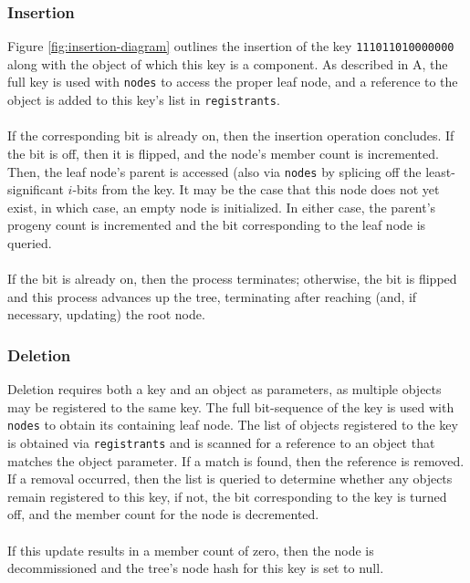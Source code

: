 \documentclass[11pt,letterpaper]{article}
\begin{document}
\subsubsection{Insertion}
Figure \ref{fig:insertion-diagram} outlines the insertion of the key
{\tt 111011010000000} along with the object of which this key
is a component.  As described in A, the full key is used with {\tt nodes}
to access the proper leaf node, and a reference to the object is
added to this key's list in {\tt registrants}.

\paragraph{}
If the corresponding bit is already on, then the insertion operation
concludes. If the bit is off, then it is flipped, and the node's member count
is incremented.  Then, the leaf node's parent is accessed (also via
{\tt nodes} by splicing off the least-significant $i$-bits from the key.
It may be the case that this node does not yet exist, in which case, 
an empty node is initialized.  In either case, the parent's progeny
count is incremented and the bit corresponding to the leaf node is queried.

\paragraph{}
If the bit is already on, then the process
terminates; otherwise, the bit is flipped and this process advances
up the tree, terminating after reaching (and, if necessary, updating)
the root node.

\subsubsection{Deletion}
Deletion requires both a key and an object as parameters, as multiple
objects may be registered to the same key.  The full bit-sequence of the
key is used with {\tt nodes} to obtain its containing leaf node.
The list of objects registered to the key is obtained via {\tt registrants}
and is scanned for a reference to an object that matches the object parameter.
If a match is found, then the reference is removed.  If a removal occurred,
then the list is queried to determine whether any objects remain registered
to this key, if not, the bit corresponding to the key is turned off, and the
member count for the node is decremented.

\paragraph{}
If this update results in a member count of zero, then the node is
decommissioned and the tree's node hash for this key is set to null.
\end{document}
